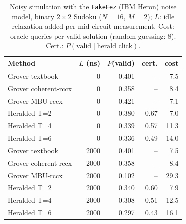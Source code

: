 \begin{table}[h]\centering\small
\caption{Noisy simulation with the \texttt{FakeFez} (IBM Heron) noise model, binary $2\times2$ Sudoku ($N=16$, $M=2$); $L$: idle relaxation added per mid-circuit measurement. Cost: oracle queries per valid solution (random guessing: 8). Cert.: $P(\text{valid}\mid\text{herald click})$.}\label{tab:noise}
\begin{tabular}{lrrrr}\toprule Method & $L$ (ns) & $P$(valid) & cert. & cost\\\midrule
Grover textbook & 0 & 0.401 & -- & 7.5\\
Grover coherent-rccx & 0 & 0.358 & -- & 8.4\\
Grover MBU-rccx & 0 & 0.421 & -- & 7.1\\
Heralded T=2 & 0 & 0.380 & 0.67 & 7.0\\
Heralded T=4 & 0 & 0.339 & 0.57 & 11.3\\
Heralded T=6 & 0 & 0.336 & 0.49 & 14.0\\
Grover textbook & 2000 & 0.401 & -- & 7.5\\
Grover coherent-rccx & 2000 & 0.358 & -- & 8.4\\
Grover MBU-rccx & 2000 & 0.102 & -- & 29.3\\
Heralded T=2 & 2000 & 0.340 & 0.60 & 7.9\\
Heralded T=4 & 2000 & 0.308 & 0.51 & 12.5\\
Heralded T=6 & 2000 & 0.297 & 0.43 & 16.1\\
\bottomrule\end{tabular}
\end{table}